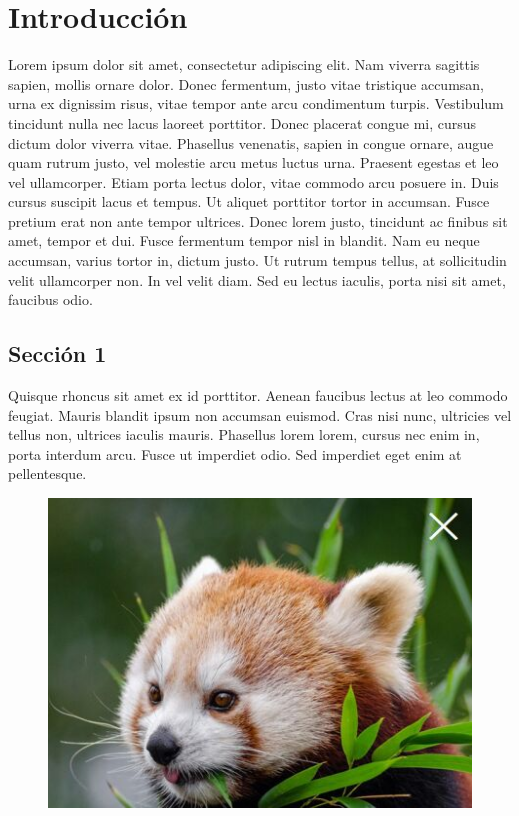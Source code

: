 \chapter{Introducción}

Lorem ipsum dolor sit amet, consectetur adipiscing elit. Nam viverra sagittis sapien, mollis ornare dolor. Donec fermentum, justo vitae tristique accumsan, urna ex dignissim risus, vitae tempor ante arcu condimentum turpis. Vestibulum tincidunt nulla nec lacus laoreet porttitor. Donec placerat congue mi, cursus dictum dolor viverra vitae. Phasellus venenatis, sapien in congue ornare, augue quam rutrum justo, vel molestie arcu metus luctus urna. Praesent egestas et leo vel ullamcorper. Etiam porta lectus dolor, vitae commodo arcu posuere in. Duis cursus suscipit lacus et tempus. Ut aliquet porttitor tortor in accumsan. Fusce pretium erat non ante tempor ultrices. Donec lorem justo, tincidunt ac finibus sit amet, tempor et dui. Fusce fermentum tempor nisl in blandit. Nam eu neque accumsan, varius tortor in, dictum justo. Ut rutrum tempus tellus, at sollicitudin velit ullamcorper non. In vel velit diam. Sed eu lectus iaculis, porta nisi sit amet, faucibus odio.

	\section{Sección 1}
	
	Quisque rhoncus sit amet ex id porttitor. Aenean faucibus lectus at leo commodo feugiat. Mauris blandit ipsum non accumsan euismod. Cras nisi nunc, ultricies vel tellus non, ultrices iaculis mauris. Phasellus lorem lorem, cursus nec enim in, porta interdum arcu. Fusce ut imperdiet odio. Sed imperdiet eget enim at pellentesque.
	
	\begin{figure}[H]
		\begin{center}
			\includegraphics[width = 0.8\imageWidth]{rsc/img/TestImage}
		\end{center} 
	\end{figure}
	
